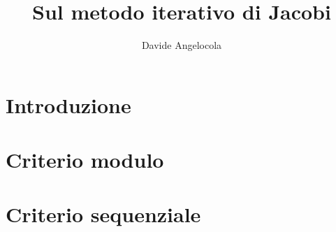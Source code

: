 \documentclass{article}
\title{Sul metodo iterativo di Jacobi}
\author{Davide Angelocola}
\begin{document}
\maketitle

\section{Introduzione}

\section{Criterio modulo}


\section{Criterio sequenziale}
\end{document}
